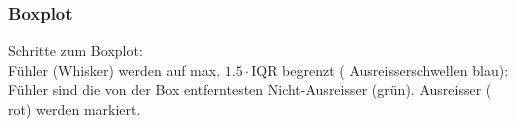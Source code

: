 \keinHeaderUndKeinFooter{}
\newpage
\keinHeaderUndKeinFooter{}
\subsubsection*{Boxplot}
Schritte zum Boxplot:\\
Fühler (Whisker) werden auf max. $1.5\cdot\textrm{IQR}$ begrenzt ({\color{blue} Ausreisserschwellen blau}): Fühler sind die von der Box
entferntesten Nicht-Ausreisser ({\color{farnFarbe}grün}). Ausreisser
({\color{red} rot}) werden markiert.

\hrulefill


